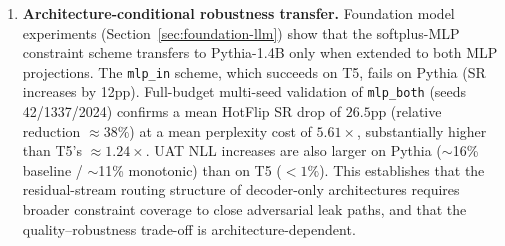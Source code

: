 \documentclass{article}
\begin{document}
\begin{enumerate}
    \item \textbf{Architecture-conditional robustness transfer.} Foundation model experiments (Section~\ref{sec:foundation-llm}) show that the softplus-MLP constraint scheme transfers to Pythia-1.4B only when extended to both MLP projections. The \texttt{mlp\_in} scheme, which succeeds on T5, fails on Pythia (SR increases by 12pp). Full-budget multi-seed validation of \texttt{mlp\_both} (seeds 42/1337/2024) confirms a mean HotFlip SR drop of $26.5$pp (relative reduction $\approx 38\%$) at a mean perplexity cost of $5.61\times$, substantially higher than T5's $\approx 1.24\times$. UAT NLL increases are also larger on Pythia ($\sim$16\% baseline / $\sim$11\% monotonic) than on T5 ($<1\%$). This establishes that the residual-stream routing structure of decoder-only architectures requires broader constraint coverage to close adversarial leak paths, and that the quality--robustness trade-off is architecture-dependent.
\end{enumerate}
\end{document}
